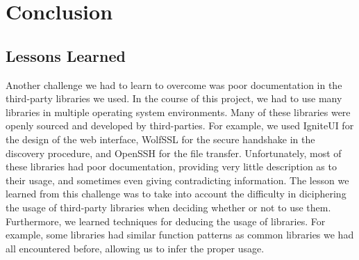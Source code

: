 \chapter{Conclusion}
\section{Lessons Learned}


Another challenge we had to learn to overcome was poor documentation in the third-party libraries we used.  In the course of this project, we had to use many libraries in multiple operating system environments.  Many of these libraries were openly sourced and developed by third-parties.  For example, we used IgniteUI for the design of the web interface, WolfSSL for the secure handshake in the discovery procedure, and OpenSSH for the file transfer.  Unfortunately, most of these libraries had poor documentation, providing very little description as to their usage, and sometimes even giving contradicting information.  The lesson we learned from this challenge was to take into account the difficulty in diciphering the usage of third-party libraries when deciding whether or not to use them.  Furthermore, we learned techniques for deducing the usage of libraries.  For example, some libraries had similar function patterns as common libraries we had all encountered before, allowing us to infer the proper usage.